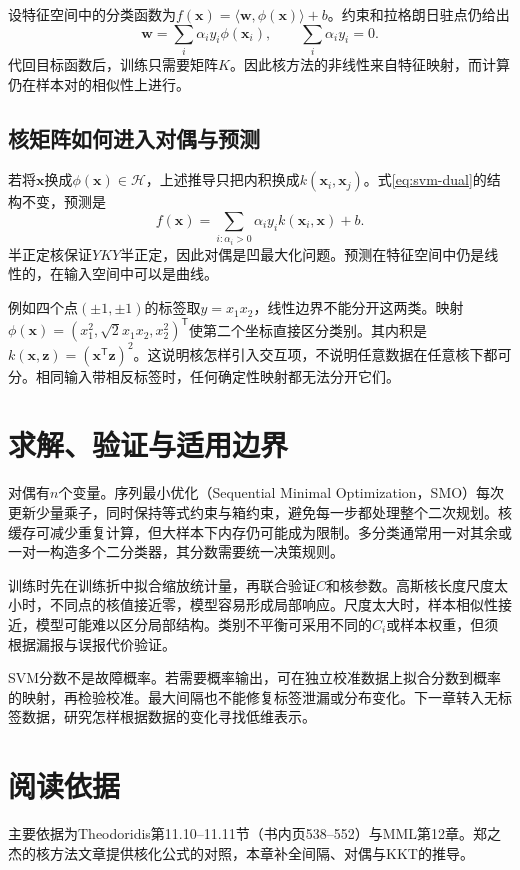 设特征空间中的分类函数为$f(\bm x)=\langle\bm w,\phi(\bm x)\rangle+b$。约束和拉格朗日驻点仍给出
\begin{equation}
 \bm w=\sum_i\alpha_i y_i\phi(\bm x_i),
 \qquad \sum_i\alpha_i y_i=0.
 \label{eq:svm-feature-space-representer}
\end{equation}
代回目标函数后，训练只需要矩阵$K$。因此核方法的非线性来自特征映射，而计算仍在样本对的相似性上进行。

\subsection{核矩阵如何进入对偶与预测}
若将$\bm x$换成$\phi(\bm x)\in\mathcal H$，上述推导只把内积换成$k(\bm x_i,\bm x_j)$。式\eqref{eq:svm-dual}的结构不变，预测是
\begin{equation}
 f(\bm x)=\sum_{i:\alpha_i>0}\alpha_i y_i k(\bm x_i,\bm x)+b.
\end{equation}
半正定核保证$YKY$半正定，因此对偶是凹最大化问题。预测在特征空间中仍是线性的，在输入空间中可以是曲线。

例如四个点$(\pm1,\pm1)$的标签取$y=x_1x_2$，线性边界不能分开这两类。映射$\phi(\bm x)=(x_1^2,\sqrt2x_1x_2,x_2^2)^{\mathsf T}$使第二个坐标直接区分类别。其内积是$k(\bm x,\bm z)=(\bm x^{\mathsf T}\bm z)^2$。这说明核怎样引入交互项，不说明任意数据在任意核下都可分。相同输入带相反标签时，任何确定性映射都无法分开它们。

\section{求解、验证与适用边界}
对偶有$n$个变量。序列最小优化（Sequential Minimal Optimization，SMO）每次更新少量乘子，同时保持等式约束与箱约束，避免每一步都处理整个二次规划。核缓存可减少重复计算，但大样本下内存仍可能成为限制。多分类通常用一对其余或一对一构造多个二分类器，其分数需要统一决策规则。

训练时先在训练折中拟合缩放统计量，再联合验证$C$和核参数。高斯核长度尺度太小时，不同点的核值接近零，模型容易形成局部响应。尺度太大时，样本相似性接近，模型可能难以区分局部结构。类别不平衡可采用不同的$C_i$或样本权重，但须根据漏报与误报代价验证。

SVM分数不是故障概率。若需要概率输出，可在独立校准数据上拟合分数到概率的映射，再检验校准。最大间隔也不能修复标签泄漏或分布变化。下一章转入无标签数据，研究怎样根据数据的变化寻找低维表示。

\section{阅读依据}
主要依据为Theodoridis第11.10--11.11节（书内页538--552）与MML第12章。郑之杰的核方法文章提供核化公式的对照\cite{zheng2021kernel}，本章补全间隔、对偶与KKT的推导。
